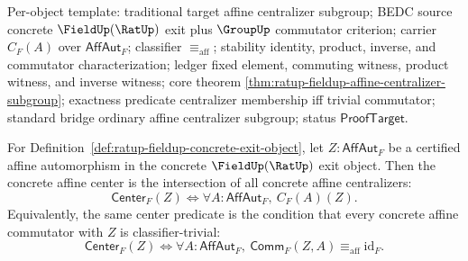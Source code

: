 Per-object template: traditional target affine centralizer subgroup; BEDC
source concrete $\FieldUp(\RatUp)$ exit plus $\GroupUp$ commutator criterion;
carrier $C_F(A)$ over $\mathsf{AffAut}_F$; classifier
$\equiv_{\mathrm{aff}}$; stability identity, product, inverse, and commutator
characterization; ledger fixed element, commuting witness, product witness, and
inverse witness; core theorem
\autoref{thm:ratup-fieldup-affine-centralizer-subgroup}; exactness predicate
centralizer membership iff trivial commutator; standard bridge ordinary affine
centralizer subgroup; status $\mathsf{ProofTarget}$.

\begin{theorem}
\label{thm:ratup-fieldup-affine-center-centralizer-intersection}
For Definition~\ref{def:ratup-fieldup-concrete-exit-object}, let
$Z:\mathsf{AffAut}_F$ be a certified affine automorphism in the concrete
$\FieldUp(\RatUp)$ exit object. Then the concrete affine center is the
intersection of all concrete affine centralizers:
$$
\mathsf{Center}_F(Z)
\Longleftrightarrow
\forall A:\mathsf{AffAut}_F,\ C_F(A)(Z).
$$
Equivalently, the same center predicate is the condition that every concrete
affine commutator with $Z$ is classifier-trivial:
$$
\mathsf{Center}_F(Z)
\Longleftrightarrow
\forall A:\mathsf{AffAut}_F,\ 
\mathsf{Comm}_F(Z,A)\equiv_{\mathrm{aff}}\mathrm{id}_F.
$$
\end{theorem}
